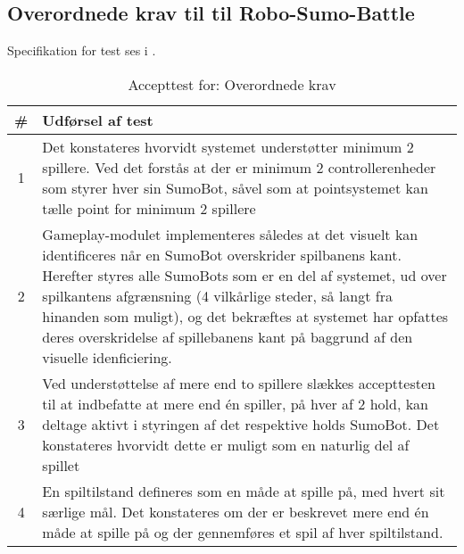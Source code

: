 \subsection{Overordnede krav til til Robo-Sumo-Battle}
Specifikation for test ses i .
\begin{table}[]
\centering
\caption{Accepttest for: Overordnede krav}\label{tab:OverordnedeKrav}
\begin{tabular}{c p{7cm}}
\# & \textbf{Udførsel af test} \\ \toprule
1 & Det konstateres hvorvidt systemet understøtter minimum 2 spillere. Ved det forstås at der er minimum 2 controllerenheder som styrer hver sin SumoBot, såvel som at pointsystemet kan tælle point for minimum 2 spillere \\\midrule
2 & Gameplay-modulet implementeres således at det visuelt kan identificeres når en SumoBot overskrider spilbanens kant. Herefter styres alle SumoBots som er en del af systemet, ud over spilkantens afgrænsning (4 vilkårlige steder, så langt fra hinanden som muligt), og det bekræftes at systemet har opfattes deres overskridelse af spillebanens kant på baggrund af den visuelle idenficiering. \\\midrule
3 & Ved understøttelse af mere end to spillere slækkes accepttesten til at indbefatte at mere end én spiller, på hver af 2 hold, kan deltage aktivt i styringen af det respektive holds SumoBot. Det konstateres hvorvidt dette er muligt som en naturlig del af spillet\\\midrule
4 & En spiltilstand defineres som en måde at spille på, med hvert sit særlige mål. Det konstateres om der er beskrevet mere end én måde at spille på og der gennemføres et spil af hver spiltilstand. \\\bottomrule
\end{tabular}
\end{table}

